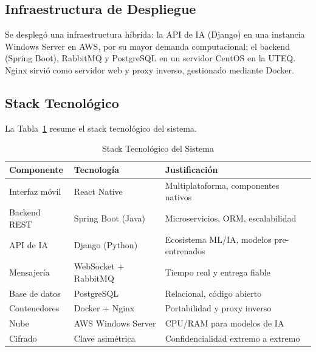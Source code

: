 \documentclass[journal]{IEEEtran}
\begin{document}
\subsection{Infraestructura de Despliegue}

Se despleg\'o una infraestructura h\'ibrida: la API de IA (Django) en una instancia Windows Server en AWS, por su mayor demanda computacional; el backend (Spring Boot), RabbitMQ y PostgreSQL en un servidor CentOS en la UTEQ. Nginx sirvi\'o como servidor web y proxy inverso, gestionado mediante Docker.

\subsection{Stack Tecnol\'ogico}

La Tabla~\ref{tab:tecnologias} resume el stack tecnol\'ogico del sistema.

\begin{table}[!t]
\caption{Stack Tecnol\'ogico del Sistema}
\label{tab:tecnologias}
\centering
\small
\renewcommand{\arraystretch}{1.2}
\begin{tabular}{p{2.0cm}p{2.2cm}p{3.2cm}}
\toprule
\textbf{Componente} & \textbf{Tecnolog\'ia} & \textbf{Justificaci\'on} \\
\midrule
Interfaz m\'ovil      & React Native         & Multiplataforma, componentes nativos \\
Backend REST          & Spring Boot (Java)   & Microservicios, ORM, escalabilidad \\
API de IA             & Django (Python)      & Ecosistema ML/IA, modelos pre-entrenados \\
Mensajer\'ia          & WebSocket + RabbitMQ & Tiempo real y entrega fiable \\
Base de datos         & PostgreSQL           & Relacional, c\'odigo abierto \\
Contenedores          & Docker + Nginx       & Portabilidad y proxy inverso \\
Nube                  & AWS Windows Server   & CPU/RAM para modelos de IA \\
Cifrado               & Clave asim\'etrica  & Confidencialidad extremo a extremo \\
\bottomrule
\end{tabular}
\end{table}

\end{document}
